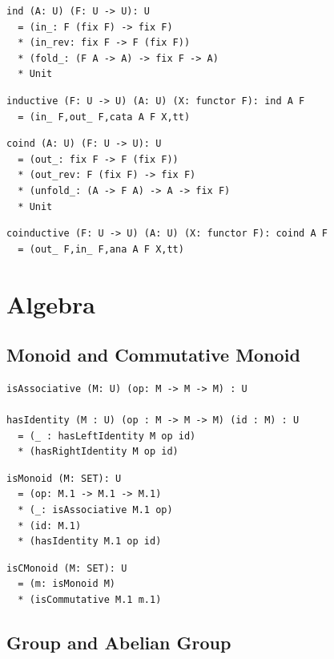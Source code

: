 \documentclass{article}
\begin{document}
\begin{lstlisting}[mathescape=true]
ind (A: U) (F: U -> U): U
  = (in_: F (fix F) -> fix F)
  * (in_rev: fix F -> F (fix F))
  * (fold_: (F A -> A) -> fix F -> A)
  * Unit
\end{lstlisting}

\begin{lstlisting}[mathescape=true]
inductive (F: U -> U) (A: U) (X: functor F): ind A F
  = (in_ F,out_ F,cata A F X,tt)
\end{lstlisting}

\begin{lstlisting}[mathescape=true]
coind (A: U) (F: U -> U): U
  = (out_: fix F -> F (fix F))
  * (out_rev: F (fix F) -> fix F)
  * (unfold_: (A -> F A) -> A -> fix F)
  * Unit
\end{lstlisting}

\begin{lstlisting}[mathescape=true]
coinductive (F: U -> U) (A: U) (X: functor F): coind A F
  = (out_ F,in_ F,ana A F X,tt)
\end{lstlisting}


\newpage
\section{Algebra}

\subsection{Monoid and Commutative Monoid}

\begin{lstlisting}[mathescape=true]
isAssociative (M: U) (op: M -> M -> M) : U

hasIdentity (M : U) (op : M -> M -> M) (id : M) : U
  = (_ : hasLeftIdentity M op id)
  * (hasRightIdentity M op id)
\end{lstlisting}

\begin{lstlisting}[mathescape=true]
isMonoid (M: SET): U
  = (op: M.1 -> M.1 -> M.1)
  * (_: isAssociative M.1 op)
  * (id: M.1)
  * (hasIdentity M.1 op id)
\end{lstlisting}

\begin{lstlisting}[mathescape=true]
isCMonoid (M: SET): U
  = (m: isMonoid M)
  * (isCommutative M.1 m.1)
\end{lstlisting}

\subsection{Group and Abelian Group}
\end{document}
